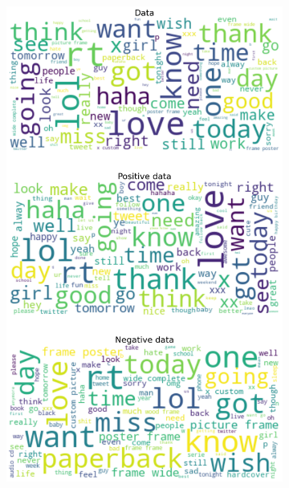 \documentclass{article}
\begin{document}
\begin{itemize}
\begin{figure}[H]
\begin{subfigure}[b]{0.24\textwidth}
\includegraphics[width=\textwidth]{chapter-06/section-01-01/07/visualization/3/wordcloud.png}
\end{subfigure}
\begin{subfigure}[b]{0.24\textwidth}
\centering

\end{subfigure}
\end{figure}
\end{itemize}
\end{document}
